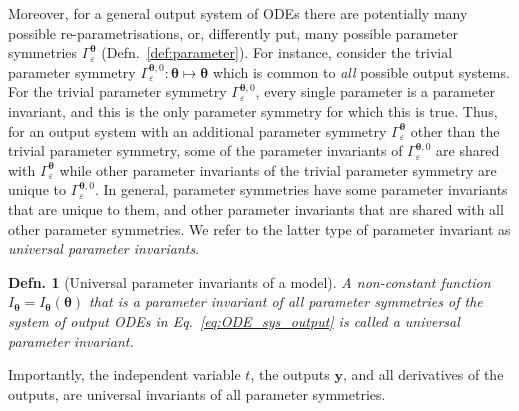 \documentclass[12pt]{article}
\newtheorem{definition}{Defn.}
\begin{document}
Moreover, for a general output system of ODEs there are potentially many possible re-parametrisations, or, differently put, many possible parameter symmetries $\Gamma_{\varepsilon}^{\boldsymbol{\theta}}$ (Defn.~\ref{def:parameter}). For instance, consider the trivial parameter symmetry $\Gamma_{\varepsilon}^{\boldsymbol{\theta},0}:\boldsymbol{\theta}\mapsto\boldsymbol{\theta}$ which is common to \emph{all} possible output systems. For the trivial parameter symmetry $\Gamma_{\varepsilon}^{\boldsymbol{\theta},0}$, every single parameter is a parameter invariant, and this is the only parameter symmetry for which this is true. Thus, for an output system with an additional parameter symmetry $\Gamma_{\varepsilon}^{\boldsymbol{\theta}}$ other than the trivial parameter symmetry, some of the parameter invariants of $\Gamma_{\varepsilon}^{\boldsymbol{\theta},0}$ are shared with $\Gamma_{\varepsilon}^{\boldsymbol{\theta}}$ while other parameter invariants of the trivial parameter symmetry are unique to $\Gamma_{\varepsilon}^{\boldsymbol{\theta},0}$. In general, parameter symmetries have some parameter invariants that are unique to them, and other parameter invariants that are shared with all other parameter symmetries. We refer to the latter type of parameter invariant as \textit{universal parameter invariants}.

\medskip
\begin{definition}[Universal parameter invariants of a model]
A non-constant function $I_{\boldsymbol{\theta}}=I_{\boldsymbol{\theta}}\left(\boldsymbol{\theta}\right)$ that is a parameter invariant of all parameter symmetries of the system of output ODEs in Eq.~\eqref{eq:ODE_sys_output} is called a \textit{universal parameter invariant}.
  \label{def:universal}  
\end{definition}

\medskip
Importantly, the independent variable $t$, the outputs $\mathbf{y}$, and all derivatives of the outputs, are universal invariants of all parameter symmetries.
\end{document}
